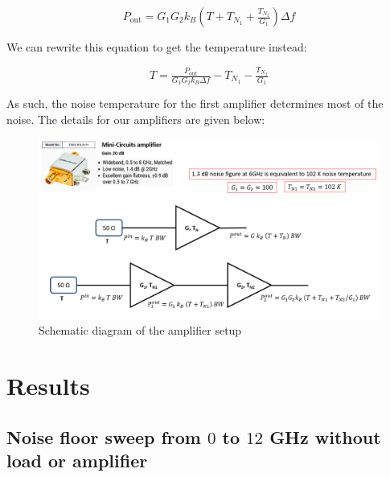 \documentclass[english,12pt,a4paper]{article}
\begin{document}
 \begin{equation}
 	P_{\textrm{out}} = G_1G_2k_B\left(T+T_{N_1}+\tfrac{T_{N_2}}{G_1} \right)\Delta f
 \end{equation}
 
 We can rewrite this equation to get the temperature instead:
 
  \begin{equation}
 	T = \tfrac{P_{\textrm{out}}}{G_1G_2k_B\Delta f} -T_{N_1} -\tfrac{T_{N_2}}{G_1} 
 \end{equation}
 
 As such, the noise temperature for the first amplifier determines most of the noise. The details for our amplifiers are given below:
 
\begin{figure}[H]
	\includegraphics[width=1\linewidth]{"noise of minicircuits amplifier chain"}
	\caption{Schematic diagram of the amplifier setup}
	\label{fig:noise-of-minicircuits-amplifier-chain}
\end{figure}

\newpage
\section{Results}
\hypertarget{noise-floor-sweep-from-0-to-12-ghz-without-load-or-amplifier}{%
	\subsection{\texorpdfstring{Noise floor sweep from \(0\) to \(12\) GHz
			without load or
			amplifier}{Noise floor sweep from 0 to 12 GHz without load or amplifier}}\label{noise-floor-sweep-from-0-to-12-ghz-without-load-or-amplifier}}
\end{document}
